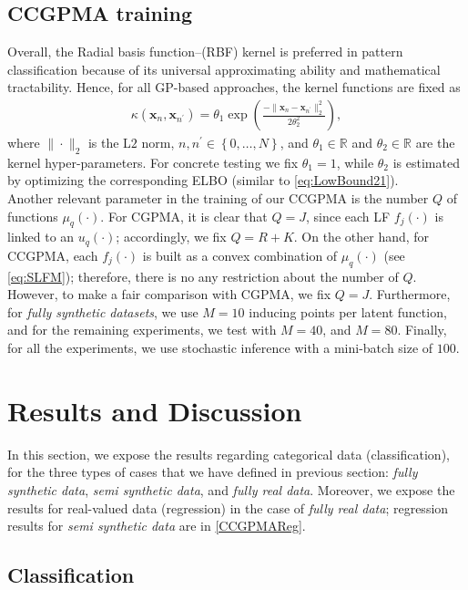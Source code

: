 \documentclass[journal]{IEEEtran}
\providecommand{\ve}[1]{{\bm{#1}}}%
\newcommand{\Real}{\mathbb{R}}
\providecommand{\ve}[1]{{\mathbf{#1}}}
\begin{document}
\subsection{CCGPMA training}\label{sec:training}
Overall, the Radial basis function--(RBF) kernel is preferred in pattern classification because of its universal approximating ability and mathematical tractability. Hence, for all GP-based approaches, the kernel functions are fixed as
\begin{align}\label{eq:RBF}
\kappa(\ve{x}_n, \ve{x}_{n^{\prime}}) = \theta_1\exp\left(\frac{-\|\ve{x}_n- \ve{x}_{n^{\prime}} \|_2^2}{2{\theta}_2^2}\right),
\end{align}
where $\|\cdot\|_2$ is the L$2$ norm, $n,n^{\prime} \in \left\{0,\dots , N\right\}$, and $\theta_1\in \Real$ and ${\theta}_2\in \Real$ are the kernel hyper-parameters. For concrete testing we fix $\theta_1 = 1$, while ${\theta}_2$ is estimated by optimizing the corresponding ELBO (similar to \eqref{eq:LowBound21}).\\
Another relevant parameter in the training of our CCGPMA is the number $Q$ of functions $\mu_q(\cdot)$. For CGPMA, it is clear that $Q=J$, since each LF $f_j(\cdot)$ is linked to an $u_q(\cdot)$; accordingly, we fix $Q=R+K$. On the other hand, for CCGPMA, each $f_j(\cdot)$ is built as a convex combination of $\mu_q(\cdot)$ (see \cref{eq:SLFM}); therefore, there is no any restriction about the number of $Q$. However, to make a fair comparison with CGPMA, we fix $Q=J$. Furthermore, for \textit{fully synthetic datasets}, we use $M=10$ inducing points per latent function, and for the remaining experiments, we test with $M=40$, and $M=80$. Finally, for all the experiments, we use stochastic inference with a mini-batch size of $100$.

\section{Results and Discussion}
In this section, we expose the results regarding categorical data (classification), for the three types of cases that we have defined in previous section: \textit{fully synthetic data}, \textit{semi synthetic data}, and \textit{fully real data}. Moreover, we expose the results for real-valued data (regression) in the case of \textit{fully real data}; regression results for \textit{semi synthetic data} are in \cref{CCGPMAReg}.

\subsection{Classification}
\end{document}
